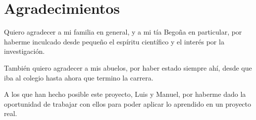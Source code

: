 \chapter*{Agradecimientos}
Quiero agradecer a mi familia en general, y a mi tía Begoña en particular, por haberme inculcado desde pequeño el espíritu científico y el interés por la investigación.

También quiero agradecer a mis abuelos, por haber estado siempre ahí, desde que iba al colegio hasta ahora que termino la carrera.

A los que han hecho posible este proyecto, Luis y Manuel, por haberme dado la oportunidad de trabajar con ellos para poder aplicar lo aprendido en un proyecto real.